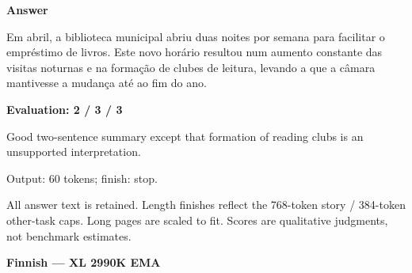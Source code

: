 \documentclass[10pt]{article}
\begin{document}
{\begin{minipage}{\textwidth}
\textbf{Answer}\par Em abril, a biblioteca municipal abriu duas noites por semana para facilitar o empréstimo de livros. Este novo horário resultou num aumento constante das visitas noturnas e na formação de clubes de leitura, levando a que a câmara mantivesse a mudança até ao fim do ano.\par\smallskip
\textbf{Evaluation: 2 / 3 / 3}\par Good two-sentence summary except that formation of reading clubs is an unsupported interpretation.
\par {\color{gray} Output: 60 tokens; finish: stop.}\par
\medskip\footnotesize All answer text is retained. Length finishes reflect the 768-token story / 384-token other-task caps. Long pages are scaled to fit. Scores are qualitative judgments, not benchmark estimates.
\end{minipage}}%
\noindent\ifdim\dimexpr\ht\languagepage+\dp\languagepage\relax>0.93\textheight%
\resizebox*{!}{0.93\textheight}{\usebox{\languagepage}}%
\else\usebox{\languagepage}\fi%
\clearpage
{\Large\bfseries Finnish --- XL 2990K EMA}\par\smallskip
\end{document}
